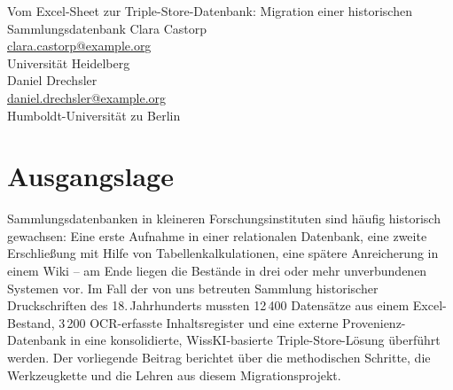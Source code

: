 \graphicspath{{abstracts/praesentationen/02-migration-sammlungsdatenbank/img/}{img/}}

\begin{beitrag}{Vom Excel-Sheet zur Triple-Store-Datenbank: Migration einer historischen Sammlungsdatenbank}{%
Clara Castorp\, \\
\small \href{mailto:clara.castorp@example.org}{clara.castorp@example.org} \\
\small Universität Heidelberg \\[0.5cm]
Daniel Drechsler\, \\
\small \href{mailto:daniel.drechsler@example.org}{daniel.drechsler@example.org} \\
\small Humboldt-Universität zu Berlin
}

\begin{abstract}
Der Beitrag berichtet über die Migration einer historisch gewachsenen Sammlungsdatenbank (12.400 Excel-Datensätze, 3.200 OCR-Inhaltsregister und eine externe Provenienz-Datenbank) in eine WissKI-basierte Triple-Store-Lösung, gegliedert in die vier Etappen Datenprofilierung, CRM-Modellierung, ETL-Transformation mit Python und RDFLib sowie SHACL-basierte Qualitätssicherung. Von 12.400 Quelldatensätzen wurden 11.840 vollständig automatisch überführt; alle Migrationsskripte liegen versioniert vor, sodass eine Re-Migration ohne manuelle Eingriffe möglich ist. Die zentrale Erkenntnis lautet: Erst profilieren, dann modellieren, dann transformieren und validieren -- in dieser Reihenfolge ist eine erfolgreiche Migration am verlässlichsten zu bewerkstelligen.
\end{abstract}

\section{Ausgangslage}
Sammlungsdatenbanken in kleineren Forschungsinstituten sind häufig historisch gewachsen: Eine erste Aufnahme in einer relationalen Datenbank, eine zweite Erschließung mit Hilfe von Tabellenkalkulationen, eine spätere Anreicherung in einem Wiki -- am Ende liegen die Bestände in drei oder mehr unverbundenen Systemen vor. Im Fall der von uns betreuten Sammlung historischer Druckschriften des 18.\,Jahrhunderts mussten 12\,400 Datensätze aus einem Excel-Bestand, 3\,200 OCR-erfasste Inhaltsregister und eine externe Provenienz-Datenbank in eine konsolidierte, WissKI-basierte Triple-Store-Lösung überführt werden. Der vorliegende Beitrag berichtet über die methodischen Schritte, die Werkzeugkette und die Lehren aus diesem Migrationsprojekt.


\end{beitrag}
